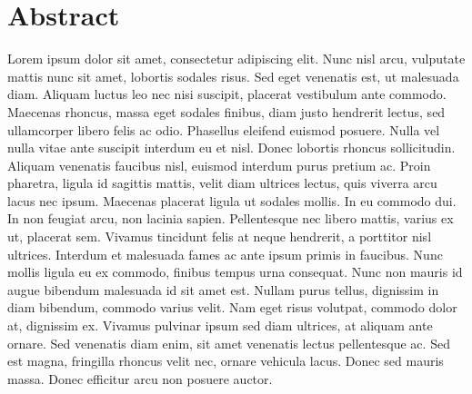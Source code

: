 \chapter*{Abstract}

Lorem ipsum dolor sit amet, consectetur adipiscing elit. Nunc nisl arcu, vulputate mattis nunc sit amet, lobortis sodales risus. Sed eget venenatis est, ut malesuada diam. Aliquam luctus leo nec nisi suscipit, placerat vestibulum ante commodo. Maecenas rhoncus, massa eget sodales finibus, diam justo hendrerit lectus, sed ullamcorper libero felis ac odio. Phasellus eleifend euismod posuere. Nulla vel nulla vitae ante suscipit interdum eu et nisl. Donec lobortis rhoncus sollicitudin. Aliquam venenatis faucibus nisl, euismod interdum purus pretium ac. Proin pharetra, ligula id sagittis mattis, velit diam ultrices lectus, quis viverra arcu lacus nec ipsum. Maecenas placerat ligula ut sodales mollis. In eu commodo dui. In non feugiat arcu, non lacinia sapien. Pellentesque nec libero mattis, varius ex ut, placerat sem. Vivamus tincidunt felis at neque hendrerit, a porttitor nisl ultrices. Interdum et malesuada fames ac ante ipsum primis in faucibus. Nunc mollis ligula eu ex commodo, finibus tempus urna consequat. Nunc non mauris id augue bibendum malesuada id sit amet est. Nullam purus tellus, dignissim in diam bibendum, commodo varius velit. Nam eget risus volutpat, commodo dolor at, dignissim ex. Vivamus pulvinar ipsum sed diam ultrices, at aliquam ante ornare. Sed venenatis diam enim, sit amet venenatis lectus pellentesque ac. Sed est magna, fringilla rhoncus velit nec, ornare vehicula lacus. Donec sed mauris massa. Donec efficitur arcu non posuere auctor.

\clearpage
